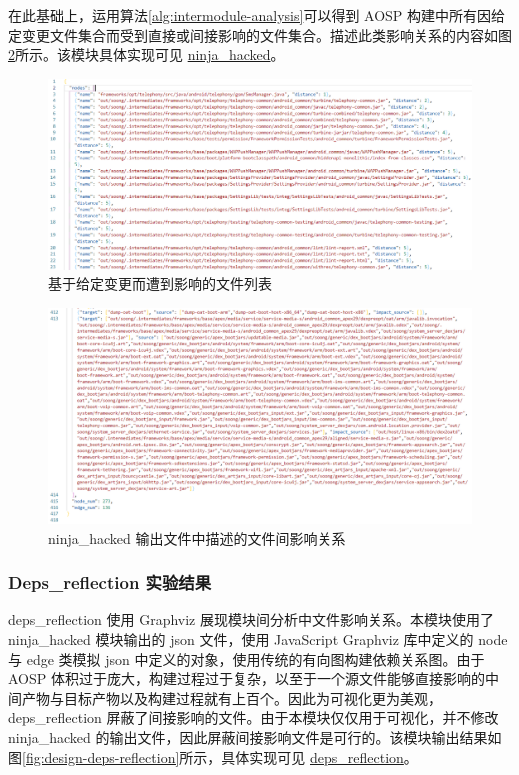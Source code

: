 在此基础上，运用算法\ref{alg:intermodule-analysis}可以得到 AOSP 构建中所有因给定变更文件集合而受到直接或间接影响的文件集合。描述此类影响关系的内容如图\ref{fig:design-edge}所示。该模块具体实现可见 \href{https://github.com/AOSPworking/ninja-hacked}{ninja\_hacked}。

\begin{figure}[htb]
    \centering
    \includegraphics[width=.9\textwidth]{figures/design-node.png}
    \caption{基于给定变更而遭到影响的文件列表}
    \label{fig:design-node}
\end{figure}

\begin{figure}[htb]
    \centering
    \includegraphics[width=.9\textwidth]{figures/design-edge.png}
    \caption{ninja\_hacked 输出文件中描述的文件间影响关系}
    \label{fig:design-edge}
\end{figure}

\subsubsection{Deps\_reflection 实验结果}

deps\_reflection 使用 Graphviz 展现模块间分析中文件影响关系。本模块使用了 ninja\_hacked 模块输出的 json 文件，使用 JavaScript Graphviz 库中定义的 node 与 edge 类模拟 json 中定义的对象，使用传统的有向图构建依赖关系图。由于 AOSP 体积过于庞大，构建过程过于复杂，以至于一个源文件能够直接影响的中间产物与目标产物以及构建过程就有上百个。因此为可视化更为美观，deps\_reflection 屏蔽了间接影响的文件。由于本模块仅仅用于可视化，并不修改 ninja\_hacked 的输出文件，因此屏蔽间接影响文件是可行的。该模块输出结果如图\ref{fig:design-deps-reflection}所示，具体实现可见 \href{https://github.com/AOSPworking/deps_reflection}{deps\_reflection}。

